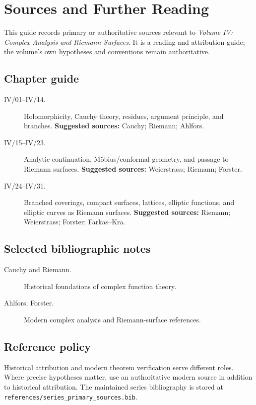 \chapter*{Sources and Further Reading}
{}

This guide records primary or authoritative sources relevant to \emph{Volume IV: Complex Analysis and Riemann Surfaces}.
It is a reading and attribution guide; the volume's own hypotheses and conventions remain authoritative.

\section*{Chapter guide}
\begin{description}
\item[IV/01--IV/14.] Holomorphicity, Cauchy theory, residues, argument principle, and branches.
\textbf{Suggested sources:} Cauchy; Riemann; Ahlfors.

\item[IV/15--IV/23.] Analytic continuation, Möbius/conformal geometry, and passage to Riemann surfaces.
\textbf{Suggested sources:} Weierstrass; Riemann; Forster.

\item[IV/24--IV/31.] Branched coverings, compact surfaces, lattices, elliptic functions, and elliptic curves as Riemann surfaces.
\textbf{Suggested sources:} Riemann; Weierstrass; Forster; Farkas--Kra.

\end{description}

\section*{Selected bibliographic notes}
\begin{description}
\item[Cauchy and Riemann.] Historical foundations of complex function theory.

\item[Ahlfors; Forster.] Modern complex analysis and Riemann-surface references.

\end{description}

\section*{Reference policy}
Historical attribution and modern theorem verification serve different roles.
Where precise hypotheses matter, use an authoritative modern source in addition to historical attribution.
The maintained series bibliography is stored at \texttt{references/series\_primary\_sources.bib}.
